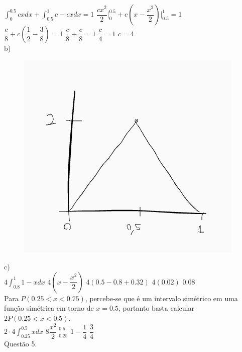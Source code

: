 \documentclass[12pt]{article}
\begin{document}
$\displaystyle\int_{0}^{0.5}cxdx+\int_{0.5}^{1}c-cxdx=1$\qquad\qquad
$\dfrac{cx^{2}}{2}\biggr|_{0}^{0.5}+c\left(x-\dfrac{x^{2}}{2}\right)\biggr|_{0.5}^{1}=1$\\

$\dfrac{c}{8}+c\left(\dfrac{1}{2}-\dfrac{3}{8}\right)=1$\qquad\qquad
$\dfrac{c}{8}+\dfrac{c}{8}=1$\qquad\qquad
$\dfrac{c}{4}=1$\qquad\qquad
$c=4$\\

\noindent b)\\

\begin{figure}[h!]
	\includegraphics[scale=0.5]{4b}
\end{figure}

\noindent c)\\

$\displaystyle 4\int_{0.8}^{1}1-xdx$\qquad\qquad
$4\left(x-\dfrac{x^{2}}{2}\right)$\qquad\qquad
$4(0.5-0.8+0.32)$\qquad\qquad
$4(0.02)$\qquad\qquad
$0.08$\\

\noindent Para $P(0.25<x<0.75)$, percebe-se que é um intervalo simétrico em uma função simétrica em torno de $x=0.5$, portanto basta calcular $2P(0.25<x<0.5)$.\\

$\displaystyle 2\cdot4\int_{0.25}^{0.5}xdx$\qquad\qquad
$8\dfrac{x^{2}}{2}\biggr|_{0.25}^{0.5}$\qquad\qquad
$1-\dfrac{1}{4}$\qquad\qquad
$\dfrac{3}{4}$\\

\noindent Questão 5.\\
\end{document}
